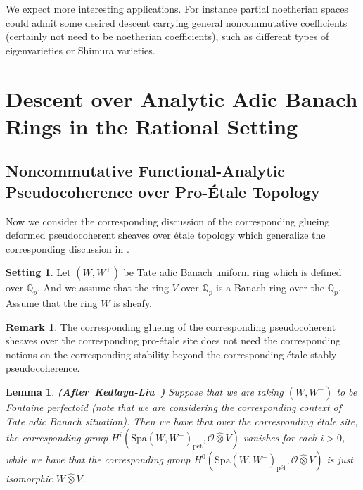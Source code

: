 \documentclass[12pt]{amsart}
\newtheorem{lemma}[theorem]{Lemma}
\theoremstyle{definition}
\newtheorem{remark}[theorem]{Remark}
\numberwithin{equation}{section}
\newtheorem{setting}[theorem]{Setting}
\begin{document}
	
\indent We expect more interesting applications. For instance partial noetherian spaces could admit some desired descent carrying general noncommutative coefficients (certainly not need to be noetherian coefficients), such as different types of eigenvarieties or Shimura varieties. 






\section{Descent over Analytic Adic Banach Rings in the Rational Setting} \label{chapter2}

\subsection{Noncommutative Functional-Analytic Pseudocoherence over Pro-\'Etale Topology}

\indent Now we consider the corresponding discussion of the corresponding glueing deformed pseudocoherent sheaves over \'etale topology which generalize the corresponding discussion in \cite{Ked1}. 

\begin{setting}
Let $(W,W^+)$ be Tate adic Banach uniform ring which is defined over $\mathbb{Q}_p$. And we assume that the ring $V$ over $\mathbb{Q}_p$ is a Banach ring over the $\mathbb{Q}_p$. Assume that the ring $W$ is sheafy. 	
\end{setting}



\begin{remark}
The corresponding glueing of the corresponding pseudocoherent sheaves over the corresponding pro-\'etale site does not need the corresponding notions on the corresponding stability beyond the corresponding \'etale-stably pseudocoherence.	
\end{remark}


\begin{lemma} \mbox{\bf{(After Kedlaya-Liu \cite[Proposition 3.4.3]{KL2})}}
Suppose that we are taking $(W,W^+)$ to be Fontaine perfectoid (note that we are considering the corresponding context of Tate adic Banach situation). Then we have that over the corresponding \'etale site, the corresponding group $H^i(\mathrm{Spa}(W,W^+)_\text{p\'et},\mathcal{O}\widehat{\otimes}V)$ vanishes for each $i>0$, while we have that the corresponding group $H^0(\mathrm{Spa}(W,W^+)_\text{p\'et},\mathcal{O}\widehat{\otimes}V)$ is just isomorphic $W\widehat{\otimes}V$.	
\end{lemma}
\end{document}
